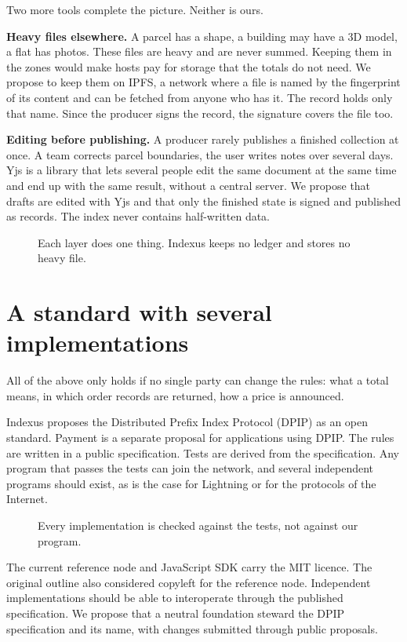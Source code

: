 \documentclass[11pt]{article}
\newcommand{\fig}[4][]{\begin{figure}[H]\centering\vspace{0.3em}\ixnew{figures/#2.tikz}\caption{#3}\label{fig:#4}\end{figure}}
\begin{document}
Two more tools complete the picture. Neither is ours.

\textbf{Heavy files elsewhere.} A parcel has a shape, a building may have a 3D model, a flat has photos. These files are heavy and are never summed. Keeping them in the zones would make hosts pay for storage that the totals do not need. We propose to keep them on IPFS, a network where a file is named by the fingerprint of its content and can be fetched from anyone who has it. The record holds only that name. Since the producer signs the record, the signature covers the file too.

\textbf{Editing before publishing.} A producer rarely publishes a finished collection at once. A team corrects parcel boundaries, the user writes notes over several days. Yjs is a library that lets several people edit the same document at the same time and end up with the same result, without a central server. We propose that drafts are edited with Yjs and that only the finished state is signed and published as records. The index never contains half-written data.

\fig{stack}{Each layer does one thing. Indexus keeps no ledger and stores no heavy file.}{stack}

\section{A standard with several implementations}

All of the above only holds if no single party can change the rules: what a total means, in which order records are returned, how a price is announced.

Indexus proposes the Distributed Prefix Index Protocol (DPIP) as an open standard. Payment is a separate proposal for applications using DPIP. The rules are written in a public specification. Tests are derived from the specification. Any program that passes the tests can join the network, and several independent programs should exist, as is the case for Lightning or for the protocols of the Internet.

\fig{standard}{Every implementation is checked against the tests, not against our program.}{standard}

The current reference node and JavaScript SDK carry the MIT licence. The original outline also considered copyleft for the reference node. Independent implementations should be able to interoperate through the published specification. We propose that a neutral foundation steward the DPIP specification and its name, with changes submitted through public proposals.
\end{document}
